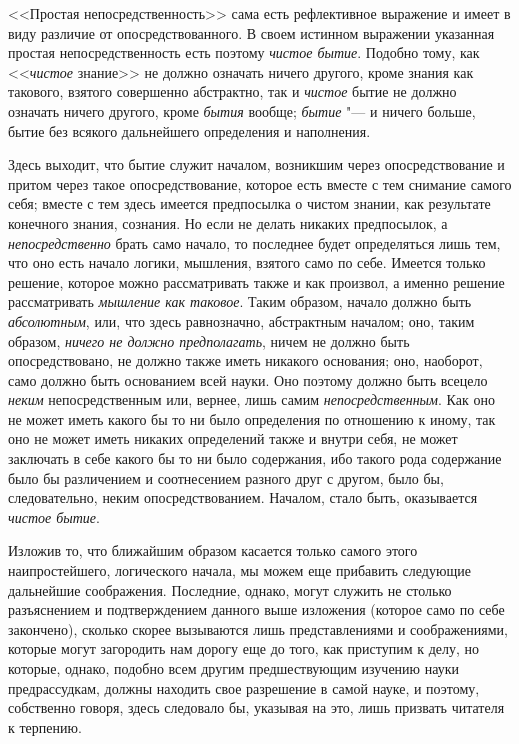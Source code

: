 <<Простая непосредственность>> сама есть рефлективное выражение и имеет в виду
различие от опосредствованного. В своем истинном выражении указанная
простая непосредственность есть поэтому {\em чистое
бытие}. Подобно тому, как <<{\em чистое} знание>> не
должно означать ничего другого, кроме знания как такового, взятого
совершенно абстрактно, так и {\em чистое} бытие не
должно означать ничего другого, кроме {\em бытия}
вообще; {\em бытие} "--- и ничего больше, бытие без
всякого дальнейшего определения и наполнения.

Здесь выходит, что бытие служит началом, возникшим через опосредствование и
притом через такое опосредствование, которое есть вместе с тем снимание
самого себя; вместе с тем здесь имеется предпосылка о чистом знании, как
результате конечного знания, сознания. Но если не делать никаких
предпосылок, а {\em непосредственно} брать само начало,
то последнее будет определяться лишь тем, что оно есть начало логики,
мышления, взятого само по себе. Имеется только решение, которое можно
рассматривать также и как произвол, а именно решение рассматривать
{\em мышление как таковое}. Таким образом, начало должно
быть {\em абсолютным}, или, что здесь равнозначно,
абстрактным началом; оно, таким образом, {\em ничего не
должно предполагать}, ничем не должно быть опосредствовано, не должно также
иметь никакого основания; оно, наоборот, само должно быть основанием всей
науки. Оно поэтому должно быть всецело {\em неким}
непосредственным или, вернее, лишь самим
{\em непосредственным}. Как оно не может иметь какого
бы то ни было определения по отношению к иному, так оно не может иметь
никаких определений также и внутри себя, не может заключать в себе какого
бы то ни было содержания, ибо такого рода содержание было бы различением и
соотнесением разного друг с другом, было бы, следовательно, неким
опосредствованием. Началом, стало быть, оказывается {\em чистое бытие}.

Изложив то, что ближайшим образом касается только самого этого
наипростейшего, логического начала, мы можем еще прибавить следующие
дальнейшие соображения. Последние, однако, могут служить не столько
разъяснением и подтверждением данного выше изложения (которое само по себе
закончено), сколько скорее вызываются лишь представлениями и соображениями,
которые могут загородить нам дорогу еще до того, как приступим к делу, но
которые, однако, подобно всем другим предшествующим изучению науки
предрассудкам, должны находить свое разрешение в самой науке, и поэтому,
собственно говоря, здесь следовало бы, указывая на это, лишь призвать
читателя к терпению.

